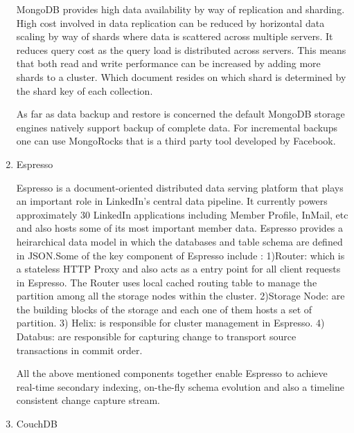 \begin{enumerate}
MongoDB provides high data availability by way of replication and
sharding. High cost involved in data replication can be reduced
by horizontal data scaling by way of shards where data is
scattered across multiple servers. It reduces query cost as the
query load is distributed across servers. This means that both
read and write performance can be increased by adding more shards
to a cluster. Which document resides on which shard is determined
by the shard key of each collection.

As far as data backup and restore is concerned the default
MongoDB storage engines natively support backup of complete
data. For incremental backups one can use MongoRocks that is a
third party tool developed by Facebook.

\item {} 
Espresso

Espresso \label{\detokenize{i524/technologies:id419}}{\hyperref[\detokenize{i524/technologies:www-linkedin-espresso}]{\sphinxcrossref{{[}358{]}}}} is a document-oriented
distributed data serving platform that plays an important role in
LinkedIn's central data pipeline. It currently powers
approximately 30 LinkedIn applications including Member Profile,
InMail, etc and also hosts some of its most important member
data. Espresso provides a heirarchical data model in which the
databases and table schema are defined in JSON.Some of the key
component of Espresso include : 1)Router: which is a stateless
HTTP Proxy and also acts as a entry point for all client requests
in Espresso. The Router uses local cached routing table to manage
the partition among all the storage nodes within the
cluster. 2)Storage Node: are the building blocks of the storage
and each one of them hosts a set of partition. 3) Helix: is
responsible for cluster management in Espresso. 4) Databus: are
responsible for capturing change to transport source transactions
in commit order.

All the above mentioned components together enable Espresso to achieve
real-time secondary indexing, on-the-fly schema evolution and also a
timeline consistent change capture stream.

\item {} 
CouchDB


\end{enumerate}
